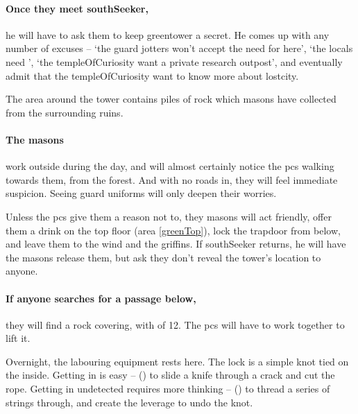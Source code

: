 \begin{multicols}{2}
\paragraph{Once they meet \gls{southSeeker},}
he will have to ask them to keep \gls{greentower} a secret.
He comes up with any number of excuses -- `the \gls{guard} \glspl{jotter} won't accept the need for  here', `the locals need ', `the \gls{templeOfCuriosity} want a private research outpost', and eventually admit that the \gls{templeOfCuriosity} want to know more about \gls{lostcity}.


The area around the tower contains piles of rock which masons have collected from the surrounding ruins.

\paragraph{The masons}
work outside during the day, and will almost certainly notice the \glspl{pc} walking towards them, from the forest.
And with no roads in, they will feel immediate suspicion.
Seeing \gls{guard} uniforms will only deepen their worries.

Unless the \glspl{pc} give them a reason not to, they masons will act friendly, offer them a drink on the top floor (area \ref{greenTop}), lock the trapdoor from below, and leave them to the wind and the griffins.
If \gls{southSeeker} returns, he will have the masons release them, but ask they don't reveal the tower's location to anyone.


\paragraph{If anyone searches for a passage below,}
they will find a rock covering, with  of 12.
The \glspl{pc} will have to work together to lift it.%


Overnight, the labouring equipment rests here.
The lock is a simple knot tied on the inside.
Getting in is easy --  (\tn[6]) to slide a knife through a crack and cut the rope.
Getting in undetected requires more thinking --  (\tn[14]) to thread a series of strings through, and create the leverage to undo the knot.


\end{multicols}

